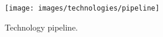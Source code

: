 
\begin{figure}[H]
	\centering
    \texttt{[image: images/technologies/pipeline]}
    \caption{Technology pipeline.}
    \label{fig:technology_pipeline}
\end{figure}

